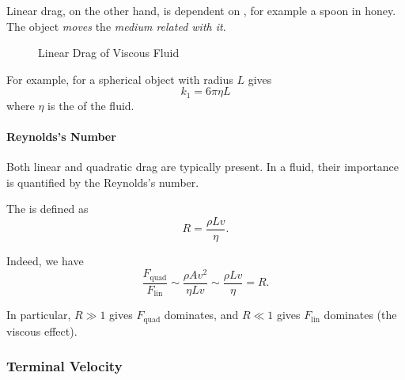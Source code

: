 Linear drag, on the other hand, is dependent on , for example a spoon in honey. The object \emph{moves} the \emph{medium related with it}.

\begin{figure}[ht!]
    \centering

    \caption{Linear Drag of Viscous Fluid}
    \label{fig:linear-drag-viscous-fluid}%
\end{figure}

For example,  for a spherical object with radius \(L\) gives
\begin{equation}
    k_1 = 6 \pi \eta L
\end{equation}
where \(\eta\) is the  of the fluid.

\paragraph{Reynolds's Number}

Both linear and quadratic drag are typically present. In a fluid, their importance is quantified by the Reynolds's number.

\begin{definition}
    \label{def:reynolds-number}%
    The  is defined as
    \begin{equation}
        \boxed{R = \frac{\rho L v}{\eta}.}
    \end{equation}
\end{definition}

Indeed, we have 
\begin{equation}
    \frac{F_{\text{quad}}}{F_{\text{lin}}} \sim \frac{\rho A v^2}{\eta L v} \sim \frac{\rho L v}{\eta} = R.
\end{equation}

In particular, \(R \gg 1\) gives \(F_{\text{quad}}\) dominates, and \(R \ll 1\) gives \(F_{\text{lin}}\) dominates (the viscous effect).

\subsubsection{Terminal Velocity}

